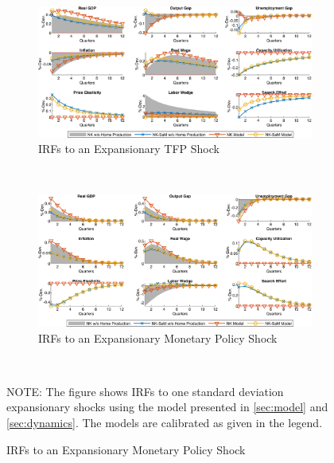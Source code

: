 \documentclass[12pt,3p,authoryear,review]{elsarticle}
\begin{document}
\begin{figure}[h!]%
    \centering%
    \caption{Dropping Home Production - IRFs to Expansionary TFP and Demand Shocks}\label{fig:app_irf_robust_hw_1}%
    \begin{subfigure}{\textwidth}%
        \centering%
        \caption{IRFs to an Expansionary TFP Shock}%
        \includegraphics[width=\textwidth]{fig_19_irf_robust_comparison_tfp.png}%
    \end{subfigure}\\%
	\vspace{0.2in}%
    \begin{subfigure}{\textwidth}%
        \centering%
        \caption{IRFs to an Expansionary Monetary Policy Shock}%
        \includegraphics[width=\textwidth]{fig_20_irf_robust_comparison_policy.png}%
    \end{subfigure}\\%
    {\tiny \singlespacing NOTE: The figure shows IRFs to one standard deviation expansionary shocks using the model presented in \cref{sec:model} and \cref{sec:dynamics}. The models are calibrated as given in the legend.\par}%
\end{figure}%
\end{document}
